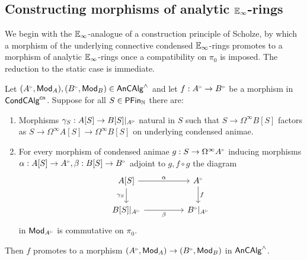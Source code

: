 \subsection{Constructing morphisms of analytic \texorpdfstring{$\mathbb{E}_{\infty}$}{E-infinity}-rings}\label{subsec: constructing morphisms}
We begin with the $\mathbb{E}_{\infty}$-analogue of a construction principle of Scholze, by which a morphism of the underlying connective condensed $\mathbb{E}_{\infty}$-rings promotes to a morphism of analytic $\mathbb{E}_{\infty}$-rings once a compatibility on $\pi_{0}$ is imposed. The reduction to the static case is immediate.
\begin{proposition}\label{prop: constructing morphisms of analytic rings}
    Let $(A^{\tri},\Mod_{A}),(B^{\tri},\Mod_{B})\in\An\CAlg^{\wedge}$ and let $f: A^{\tri}\to B^{\tri}$ be a morphism in $\mathsf{Cond}\mathsf{CAlg}^{\mathsf{cn}}$. Suppose for all $S\in\mathsf{PFin}_{\mathbb{N}}$ there are:
    \begin{enumerate}[label=(\roman*)]
        \item Morphisms $\gamma_{S}:A[S]\to B[S]|_{A^{\tri}}$ natural in $S$ such that $S\to \Omega^{\infty}B[S]$ factors as $S\to\Omega^{\infty}A[S]\to\Omega^{\infty}B[S]$ on underlying condensed animae. 
        \item For every morphism of condensed animae $g:S\to \Omega^{\infty}A^{\tri}$ inducing morphisms $\alpha:A[S]\to A^{\tri},\beta:B[S]\to B^{\tri}$ adjoint to $g,f\circ g$ the diagram 
        $$%
        \begin{tikzcd}
            {A[S]} && {A^{\tri}} \\
            {B[S]|_{A^{\tri}}} && {B^{\tri}|_{A^{\tri}}}
            \arrow["\alpha", from=1-1, to=1-3]
            \arrow["{\gamma_{S}}"', from=1-1, to=2-1]
            \arrow["f", from=1-3, to=2-3]
            \arrow["\beta"', from=2-1, to=2-3]
        \end{tikzcd}$$
        in $\Mod_{A^{\tri}}$ is commutative on $\pi_{0}$.
    \end{enumerate}
    Then $f$ promotes to a morphism $(A^{\tri},\Mod_{A})\to(B^{\tri},\Mod_{B})$ in $\mathsf{An}\mathsf{CAlg}^{\wedge}$.
\end{proposition}
